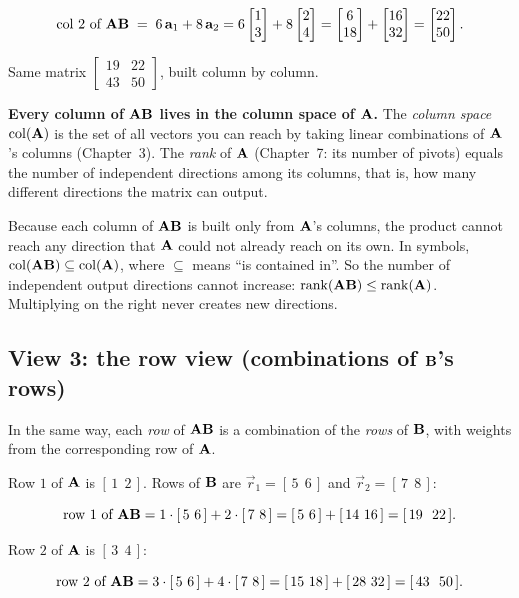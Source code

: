 \[
\text{col 2 of } \mathbf{A}\mathbf{B} \;=\; 6\,\mathbf{a}_1 + 8\,\mathbf{a}_2
= 6\begin{bmatrix}1\\3\end{bmatrix} + 8\begin{bmatrix}2\\4\end{bmatrix}
= \begin{bmatrix}6\\18\end{bmatrix} + \begin{bmatrix}16\\32\end{bmatrix} = \begin{bmatrix}22\\50\end{bmatrix}.
\]

Same matrix $\begin{bmatrix}19 & 22\\ 43 & 50\end{bmatrix}$, built column by column.

\begin{focusbox}
\textbf{Every column of $\mathbf{A}\mathbf{B}$ lives in the column space of $\mathbf{A}$.}
The \emph{column space} $\operatorname{col}(\mathbf{A})$ is the set of all vectors you can reach
by taking linear combinations of $\mathbf{A}$'s columns (Chapter~3). The \emph{rank} of
$\mathbf{A}$ (Chapter~7: its number of pivots) equals the number of independent directions
among its columns, that is, how many different directions the matrix can output.

Because each column of $\mathbf{A}\mathbf{B}$ is built only from $\mathbf{A}$'s columns, the
product cannot reach any direction that $\mathbf{A}$ could not already reach on its own.
In symbols, $\operatorname{col}(\mathbf{A}\mathbf{B}) \subseteq \operatorname{col}(\mathbf{A})$, where $\subseteq$ means
``is contained in''. So the number of independent output directions cannot increase:
$\operatorname{rank}(\mathbf{A}\mathbf{B}) \le \operatorname{rank}(\mathbf{A})$. Multiplying on the right never creates new
directions.
\end{focusbox}

\subsection{View 3: the row view (combinations of $\mathbf{B}$'s rows)}

In the same way, each \emph{row} of $\mathbf{A}\mathbf{B}$ is a combination of the
\emph{rows} of $\mathbf{B}$, with weights from the corresponding row of $\mathbf{A}$.

Row $1$ of $\mathbf{A}$ is $[\,1 \ \ 2\,]$. Rows of $\mathbf{B}$ are
$\vec{r}_1 = [\,5 \ \ 6\,]$ and $\vec{r}_2 = [\,7 \ \ 8\,]$:

\[
\text{row 1 of } \mathbf{A}\mathbf{B} = 1\cdot[\,5 \ 6\,] + 2\cdot[\,7\ 8\,]
= [\,5\ 6\,] + [\,14\ 16\,] = [\,19\ \ 22\,].
\]

Row $2$ of $\mathbf{A}$ is $[\,3\ \ 4\,]$:

\[
\text{row 2 of } \mathbf{A}\mathbf{B} = 3\cdot[\,5\ 6\,] + 4\cdot[\,7\ 8\,]
= [\,15\ 18\,] + [\,28\ 32\,] = [\,43\ \ 50\,].
\]

